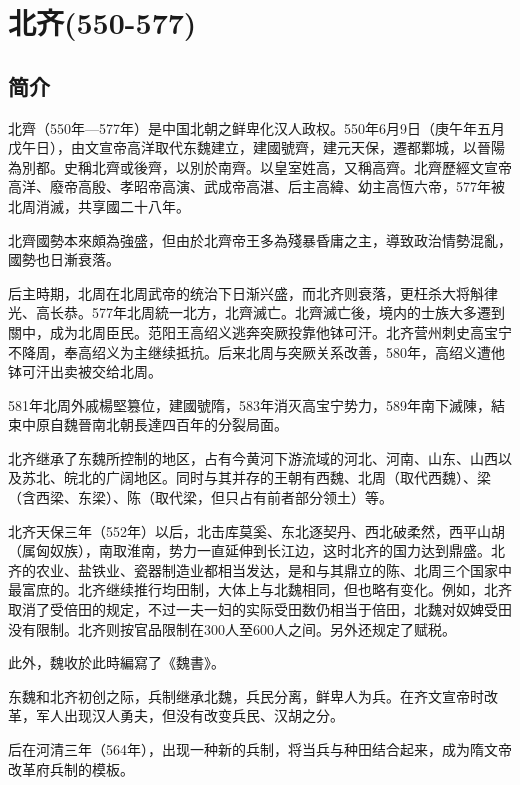 

\section{北齐\tiny(550-577)}

\subsection{简介}

北齊（550年—577年）是中国北朝之鲜卑化汉人政权。550年6月9日（庚午年五月戊午日），由文宣帝高洋取代东魏建立，建國號齊，建元天保，遷都鄴城，以晉陽為別都。史稱北齊或後齊，以別於南齊。以皇室姓高，又稱高齊。北齊歷經文宣帝高洋、廢帝高殷、孝昭帝高演、武成帝高湛、后主高緯、幼主高恆六帝，577年被北周消滅，共享國二十八年。

北齊國勢本來頗為強盛，但由於北齊帝王多為殘暴昏庸之主，導致政治情勢混亂，國勢也日漸衰落。

后主時期，北周在北周武帝的统治下日渐兴盛，而北齐则衰落，更枉杀大将斛律光、高长恭。577年北周統一北方，北齊滅亡。北齊滅亡後，境内的士族大多遷到關中，成为北周臣民。范阳王高绍义逃奔突厥投靠他钵可汗。北齐营州刺史高宝宁不降周，奉高绍义为主继续抵抗。后来北周与突厥关系改善，580年，高绍义遭他钵可汗出卖被交给北周。

581年北周外戚楊堅篡位，建國號隋，583年消灭高宝宁势力，589年南下滅陳，結束中原自魏晉南北朝長達四百年的分裂局面。

北齐继承了东魏所控制的地区，占有今黄河下游流域的河北、河南、山东、山西以及苏北、皖北的广阔地区。同时与其并存的王朝有西魏、北周（取代西魏）、梁（含西梁、东梁）、陈（取代梁，但只占有前者部分领土）等。

北齐天保三年（552年）以后，北击库莫奚、东北逐契丹、西北破柔然，西平山胡（属匈奴族），南取淮南，势力一直延伸到长江边，这时北齐的国力达到鼎盛。北齐的农业、盐铁业、瓷器制造业都相当发达，是和与其鼎立的陈、北周三个国家中最富庶的。北齐继续推行均田制，大体上与北魏相同，但也略有变化。例如，北齐取消了受倍田的规定，不过一夫一妇的实际受田数仍相当于倍田，北魏对奴婢受田没有限制。北齐则按官品限制在300人至600人之间。另外还规定了赋税。

此外，魏收於此時編寫了《魏書》。

东魏和北齐初创之际，兵制继承北魏，兵民分离，鲜卑人为兵。在齐文宣帝时改革，军人出现汉人勇夫，但没有改变兵民、汉胡之分。

后在河清三年（564年），出现一种新的兵制，将当兵与种田结合起来，成为隋文帝改革府兵制的模板。

